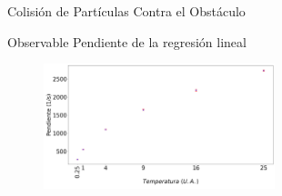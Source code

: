 \begin{frame}{Colisión de Partículas Contra el Obstáculo}
    \begin{block}{Observable}
        Pendiente de la regresión lineal
    \end{block}

    \begin{figure}[H]
        \centering
        \includegraphics[width=0.6\textwidth]{pic/ejer3/bObs}
        \label{fig:ejer3:bobservable}
    \end{figure}

\end{frame}


